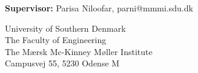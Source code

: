 \begin{titlepage}
\begin{center}
\vspace{7mm}

\textbf{Supervisor:} Parisa Niloofar, parni@mmmi.sdu.dk \\

\vfill

University of Southern Denmark \\
The Faculty of Engineering \\
The Mærsk Mc-Kinney Møller Institute \\
Campusvej 55, 5230 Odense M 

\end{center}
\end{titlepage}
